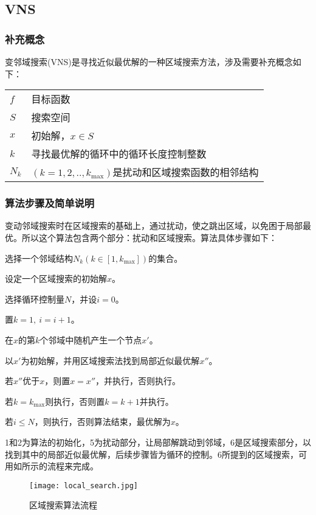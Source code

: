 \subsection{VNS}
\subsubsection{补充概念}
变邻域搜索(VNS)是寻找近似最优解的一种区域搜索方法，涉及需要补充概念如下：

\begin{tabular}{ll}
$f$ & 目标函数\\
$S$ & 搜索空间 \\
$x$ & 初始解，$x\in S$\\
$k$ & 寻找最优解的循环中的循环长度控制整数\\
$N_k$ & $(k = 1,2,..,k_{\max})$是扰动和区域搜索函数的相邻结构
\end{tabular}
\subsubsection{算法步骤及简单说明}
变动邻域搜索时在区域搜索的基础上，通过扰动，使之跳出区域，以免困于局部最优。所以这个算法包含两个部分：扰动和区域搜索。算法具体步骤如下：
\begin{asparaenum}
\renewcommand{\labelenumi}{\heiti 步骤\theenumi~}
\item 选择一个邻域结构$N_k(k\in [1,k_{\max}])$的集合。
\item 设定一个区域搜索的初始解$x$。
\item 选择循环控制量$N$，并设$i=0$。
\item 置$k = 1,\ i = i+1$。
\item 在$x$的第$k$个邻域中随机产生一个节点$x'$。
\item 以$x'$为初始解，并用区域搜索法找到局部近似最优解$x''$。
\item 若$x''$优于$x$，则置$x = x''$，并执行，否则执行。
\item 若$k = k_{\max}$则执行，否则置$k = k+1$并执行。
\item 若$i\leqslant N$，则执行，否则算法结束，最优解为$x$。
\end{asparaenum}

\Step1和\Step2为算法的初始化，\Step5为扰动部分，让局部解跳动到邻域，\Step6是区域搜索部分，以找到其中的局部近似最优解，后续步骤皆为循环的控制。\Step6所提到的区域搜索，可用如所示的流程来完成。
\begin{figure}[h]
\centering
\texttt{[image: local\_search.jpg]}
\caption{区域搜索算法流程\label{fig:local_search}}
\end{figure}
